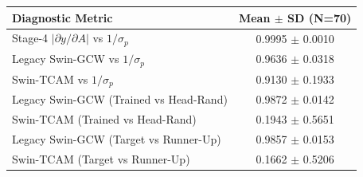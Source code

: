 \begin{tabular}{lc}
\toprule
Diagnostic Metric & Mean $\pm$ SD (N=70) \\
\midrule
Stage-4 $|\partial y/\partial A|$ vs $1/\sigma_p$ & 0.9995 $\pm$ 0.0010 \\
Legacy Swin-GCW vs $1/\sigma_p$ & 0.9636 $\pm$ 0.0318 \\
Swin-TCAM vs $1/\sigma_p$ & 0.9130 $\pm$ 0.1933 \\
Legacy Swin-GCW (Trained vs Head-Rand) & 0.9872 $\pm$ 0.0142 \\
Swin-TCAM (Trained vs Head-Rand) & 0.1943 $\pm$ 0.5651 \\
Legacy Swin-GCW (Target vs Runner-Up) & 0.9857 $\pm$ 0.0153 \\
Swin-TCAM (Target vs Runner-Up) & 0.1662 $\pm$ 0.5206 \\
\bottomrule
\end{tabular}
